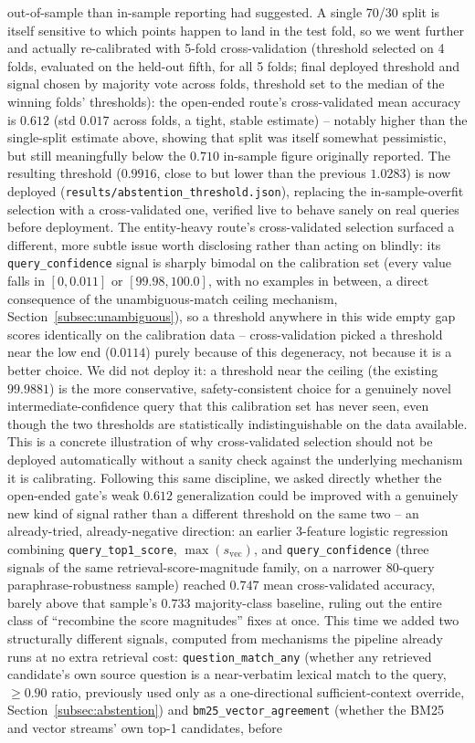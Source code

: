\documentclass[a4paper,twoside]{article}
\begin{document}
out-of-sample than in-sample reporting had suggested. A single 70/30 split is itself sensitive to which points happen to land in the test fold, so we went further and actually re-calibrated with 5-fold cross-validation (threshold selected on 4 folds, evaluated on the held-out fifth, for all 5 folds; final deployed threshold and signal chosen by majority vote across folds, threshold set to the median of the winning folds' thresholds): the open-ended route's cross-validated mean accuracy is $0.612$ (std $0.017$ across folds, a tight, stable estimate) -- notably higher than the single-split estimate above, showing that split was itself somewhat pessimistic, but still meaningfully below the $0.710$ in-sample figure originally reported. The resulting threshold ($0.9916$, close to but lower than the previous $1.0283$) is now deployed (\texttt{results/abstention\_threshold.json}), replacing the in-sample-overfit selection with a cross-validated one, verified live to behave sanely on real queries before deployment. The entity-heavy route's cross-validated selection surfaced a different, more subtle issue worth disclosing rather than acting on blindly: its \texttt{query\_confidence} signal is sharply bimodal on the calibration set (every value falls in $[0, 0.011]$ or $[99.98, 100.0]$, with no examples in between, a direct consequence of the unambiguous-match ceiling mechanism, Section~\ref{subsec:unambiguous}), so a threshold anywhere in this wide empty gap scores identically on the calibration data -- cross-validation picked a threshold near the low end ($0.0114$) purely because of this degeneracy, not because it is a better choice. We did not deploy it: a threshold near the ceiling (the existing $99.9881$) is the more conservative, safety-consistent choice for a genuinely novel intermediate-confidence query that this calibration set has never seen, even though the two thresholds are statistically indistinguishable on the data available. This is a concrete illustration of why cross-validated selection should not be deployed automatically without a sanity check against the underlying mechanism it is calibrating. Following this same discipline, we asked directly whether the open-ended gate's weak $0.612$ generalization could be improved with a genuinely new kind of signal rather than a different threshold on the same two -- an already-tried, already-negative direction: an earlier 3-feature logistic regression combining \texttt{query\_top1\_score}, $\max(s_{\mathrm{vec}})$, and \texttt{query\_confidence} (three signals of the same retrieval-score-magnitude family, on a narrower 80-query paraphrase-robustness sample) reached $0.747$ mean cross-validated accuracy, barely above that sample's $0.733$ majority-class baseline, ruling out the entire class of ``recombine the score magnitudes'' fixes at once. This time we added two structurally different signals, computed from mechanisms the pipeline already runs at no extra retrieval cost: \texttt{question\_match\_any} (whether any retrieved candidate's own source question is a near-verbatim lexical match to the query, $\geq 0.90$ ratio, previously used only as a one-directional sufficient-context override, Section~\ref{subsec:abstention}) and \texttt{bm25\_vector\_agreement} (whether the BM25 and vector streams' own top-1 candidates, before 
\end{document}
